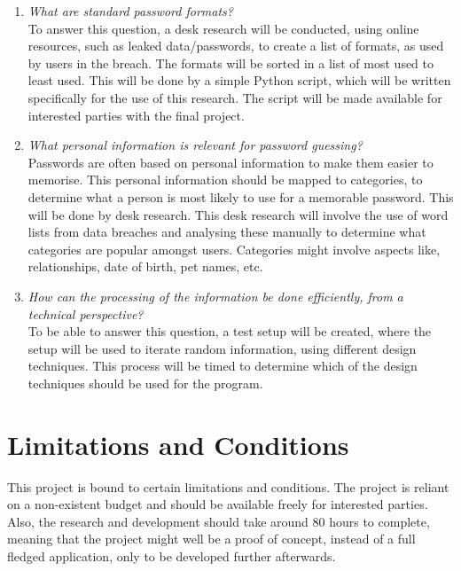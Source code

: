 \documentclass[a4paper,12pt]{article}
\begin{document}
\begin{enumerate}
\item \textit{What are standard password formats?}\\
  To answer this question, a desk research will be conducted, using online resources, such as leaked data/passwords, to create a list of formats, as used by users in the breach. The formats will be sorted in a list of most used to least used. This will be done by a simple Python script, which will be written specifically for the use of this research. The script will be made available for interested parties with the final project.
  
\item \textit{What personal information is relevant for password guessing?}\\
  Passwords are often based on personal information to make them easier to memorise. This personal information should be mapped to categories, to determine what a person is most likely to use for a memorable password. This will be done by desk research. This desk research will involve the use of word lists from data breaches and analysing these manually to determine what categories are popular amongst users. Categories might involve aspects like, relationships, date of birth, pet names, etc.
  
\item \textit{How can the processing of the information be done efficiently, from a technical perspective?}\\
  To be able to answer this question, a test setup will be created, where the setup will be used to iterate random information, using different design techniques. This process will be timed to determine which of the design techniques should be used for the program.
  
\end{enumerate}

\newpage
\section{Limitations and Conditions}
This project is bound to certain limitations and conditions. The project is reliant on a non-existent budget and should be available freely for interested parties. Also, the research and development should take around 80 hours to complete, meaning that the project might well be a proof of concept, instead of a full fledged application, only to be developed further afterwards.\\
\end{document}
